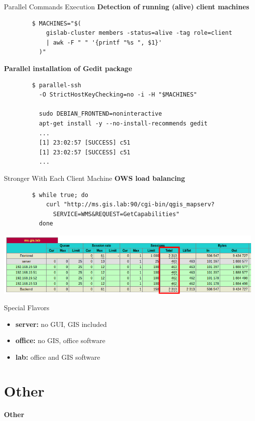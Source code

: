 \documentclass[12pt]{beamer}
\begin{document}
\begin{frame}[fragile]{Parallel Commands Execution}
	\textbf{Detection of running (alive) client machines}
	\lstset{language=sh}
	\begin{lstlisting}
		$ MACHINES="$(
		    gislab-cluster members -status=alive -tag role=client
		    | awk -F " " '{printf "%s ", $1}'
		  )"
	\end{lstlisting}
	
	\textbf{Parallel installation of Gedit package}
	\begin{lstlisting}
		$ parallel-ssh
		  -O StrictHostKeyChecking=no -i -H "$MACHINES"

		  sudo DEBIAN_FRONTEND=noninteractive
		  apt-get install -y --no-install-recommends gedit
		  ...
		  [1] 23:02:57 [SUCCESS] c51
		  [1] 23:02:57 [SUCCESS] c51
		  ...
	\end{lstlisting}
\end{frame}

\begin{frame}[fragile]{Stronger With Each Client Machine}
	\textbf{OWS load balancing}

	\lstset{language=sh}
	\begin{lstlisting}
		$ while true; do
		    curl "http://ms.gis.lab:90/cgi-bin/qgis_mapserv?
		      SERVICE=WMS&REQUEST=GetCapabilities"
		  done
	\end{lstlisting}
	\begin{center}
		\includegraphics[keepaspectratio=true,width=\textwidth]{images/lb-stats.png}
	\end{center}
\end{frame}

\begin{frame}{Special Flavors}
	\begin{itemize}
		\item \textbf{server:} no GUI, GIS included
		\item \textbf{office:} no GIS, office software
		\item \textbf{lab:} office and GIS software
	\end{itemize}
\end{frame}

\section{Other}
\begin{frame}
	\begin{center}
		\LARGE\textbf{Other}
	\end{center}
\end{frame}
\end{document}
